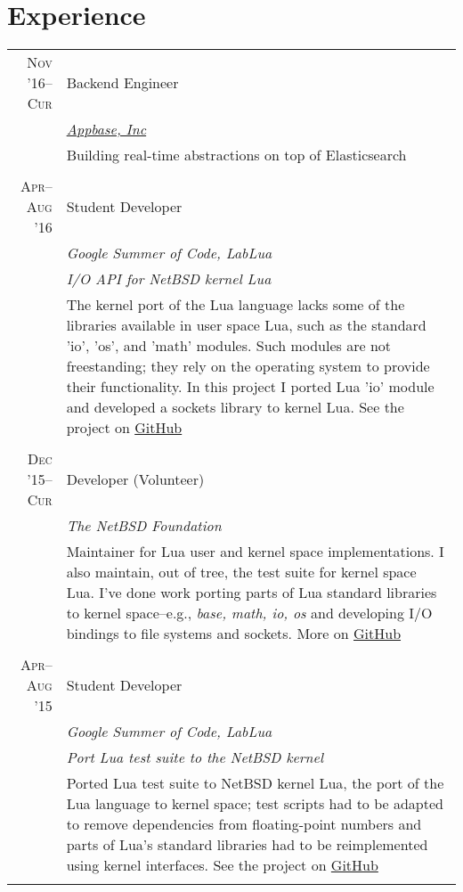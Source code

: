 \documentclass[a4paper,10pt]{article}
\begin{document}
\section{Experience}

\begin{longtable}{r|p{11cm}}

  \textsc{Nov '16--Cur}
  & Backend Engineer\\
  &\emph{\href{https://appbase.io}{Appbase, Inc}}\\
  &\footnotesize{Building real-time abstractions on top of
  Elasticsearch}
  \\\multicolumn{2}{c}{} \\

  \textsc{Apr--Aug '16} & Student Developer \\
  &\emph{Google Summer of Code, LabLua}\\
  &\emph{\footnotesize{I/O API for NetBSD kernel Lua}}\\
  &\footnotesize{The kernel port of the Lua language lacks some of the libraries
  available in user space Lua, such as the standard 'io', 'os', and 'math' modules. 
  Such modules are not freestanding; they rely on the operating system to provide
  their functionality. In this project I ported Lua 'io' module and developed a 
  sockets library to kernel Lua. See the project on 
  \href{https://GitHub.com/salazar/luaio}{GitHub}}
  \\\multicolumn{2}{c}{} \\

  \textsc{Dec '15--Cur}
  & Developer (Volunteer)\\
  &\emph{The NetBSD Foundation}\\
  &\footnotesize{Maintainer for Lua user and kernel space implementations. I
  also maintain, out of tree, the test suite for kernel space Lua. I've done
  work porting parts of Lua standard libraries to kernel space--e.g., \emph{base, 
  math, io, os} and developing I/O bindings to file systems and sockets. More 
  on \href{https://GitHub.com/salazar/netbsd}{GitHub}}
  \\\multicolumn{2}{c}{} \\
  
  \textsc{Apr--Aug '15}
  & Student Developer \\
  &\emph{Google Summer of Code, LabLua}\\
  &\emph{\footnotesize{Port Lua test
         suite to the NetBSD kernel}}\\
  &\footnotesize{Ported Lua test suite to NetBSD kernel Lua, the port of the Lua
  language to kernel space; test scripts
   had to be adapted to remove dependencies from floating-point numbers and parts
   of Lua's standard libraries had to be reimplemented using kernel interfaces.
   See the project on 
   \href{https://GitHub.com/salazar/luatests}{GitHub}}
  \\\multicolumn{2}{c}{} \\


\end{longtable}
\end{document}
